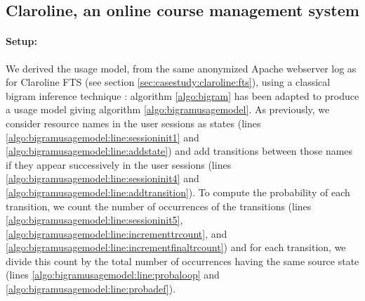 \subsection{Claroline, an online course management system}

\paragraph{Setup:}

We derived the \gls{usage model}, from the same anonymized Apache webserver log as for Claroline FTS (see section \ref{sec:casestudy:claroline:fts}), using a classical bigram inference technique \cite{Ghezzi2014,Sampath2008,Sprenkle2013}: algorithm \ref{algo:bigram} has been adapted to produce a usage model giving algorithm \ref{algo:bigramusagemodel}. As previously, we consider resource names in the user sessions as states (lines \ref{algo:bigramusagemodel:line:sessioninit1} and \ref{algo:bigramusagemodel:line:addstate}) and add transitions between those names if they appear successively in the user sessions (lines \ref{algo:bigramusagemodel:line:sessioninit4} and \ref{algo:bigramusagemodel:line:addtransition}). To compute the probability of each transition, we count the number of occurrences of the transitions (lines \ref{algo:bigramusagemodel:line:sessioninit5}, \ref{algo:bigramusagemodel:line:incrementtrcount}, and \ref{algo:bigramusagemodel:line:incrementfinaltrcount}) and for each transition, we divide this count by the total number of occurrences having the same source state (lines \ref{algo:bigramusagemodel:line:probaloop} and \ref{algo:bigramusagemodel:line:probadef}).

